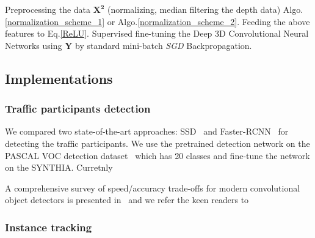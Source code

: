 \documentclass[10pt,twocolumn,letterpaper]{article}
\begin{document}
\begin{algorithm}
{{    }{
        Preprocessing the data $ \mathbf{X^2}$ (normalizing, median filtering the depth data) Algo.\ref{normalization_scheme_1} or Algo.\ref{normalization_scheme_2}.\;
        Feeding the above features to Eq.\ref{ReLU}. \;
        Supervised fine-tuning the Deep 3D Convolutional Neural Networks using $ \mathbf{Y}$ by standard mini-batch \emph{SGD} Backpropagation.\;
    }
}
\end{algorithm}

\subsection{Implementations}

\subsubsection{Traffic participants detection}

We compared two state-of-the-art approaches: SSD~\cite{liu2016ssd} and Faster-RCNN~\cite{ren2015faster} for detecting the traffic participants.
We use the pretrained detection network on the PASCAL VOC detection dataset~\cite{everingham2015pascal} which has 20 classes and fine-tune the network on the SYNTHIA. Curretnly

A comprehensive survey of speed/accuracy trade-offs for modern convolutional object detectors is presented in~\cite{huang2017speed} and we refer the keen readers to


\subsubsection{Instance tracking}
\end{document}
